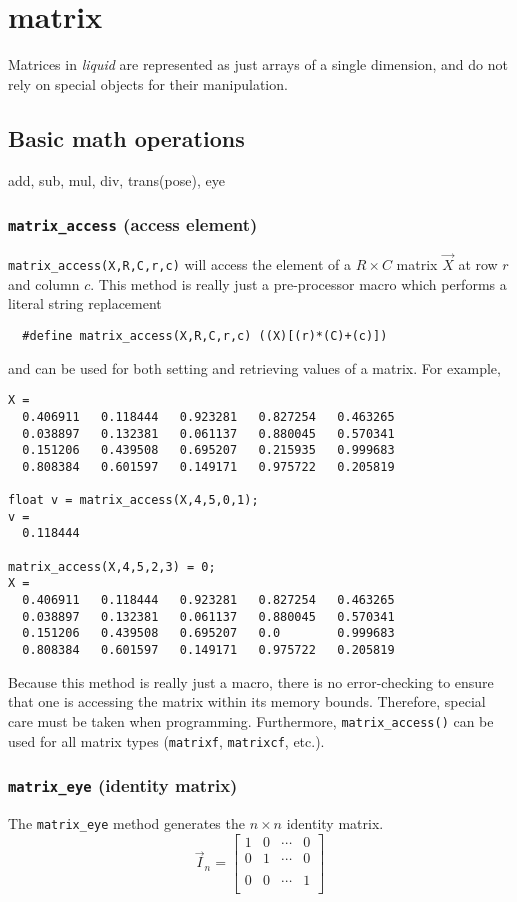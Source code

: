 % 
%
\section{matrix}
\label{module:matrix}
Matrices in {\it liquid} are represented as just arrays of a single dimension,
and do not rely on special objects for their manipulation.


\subsection{Basic math operations}
\label{module:matrix:math}
add, sub, mul, div, trans(pose), eye

\subsubsection{{\tt matrix\_access} (access element)}
{\tt matrix\_access(X,R,C,r,c)} will access the element of a $R \times C$
matrix $\vec{X}$ at row $r$ and column $c$.
This method is really just a pre-processor macro which performs a literal
string replacement
\begin{verbatim}
  #define matrix_access(X,R,C,r,c) ((X)[(r)*(C)+(c)])
\end{verbatim}
and can be used for both setting and retrieving values of a matrix.
For example,
\begin{verbatim}
X = 
  0.406911   0.118444   0.923281   0.827254   0.463265
  0.038897   0.132381   0.061137   0.880045   0.570341
  0.151206   0.439508   0.695207   0.215935   0.999683
  0.808384   0.601597   0.149171   0.975722   0.205819

float v = matrix_access(X,4,5,0,1);
v =
  0.118444

matrix_access(X,4,5,2,3) = 0;
X =
  0.406911   0.118444   0.923281   0.827254   0.463265
  0.038897   0.132381   0.061137   0.880045   0.570341
  0.151206   0.439508   0.695207   0.0        0.999683
  0.808384   0.601597   0.149171   0.975722   0.205819
\end{verbatim}
Because this method is really just a macro, there is no error-checking to
ensure that one is accessing the matrix within its memory bounds.
Therefore, special care must be taken when programming.
Furthermore, {\tt matrix\_access()} can be used for all matrix types
({\tt matrixf}, {\tt matrixcf}, etc.).

\subsubsection{{\tt matrix\_eye} (identity matrix)}
The {\tt matrix\_eye} method generates the $n \times n$ identity matrix.
\[
    \vec{I}_n = 
    \begin{bmatrix}
        1 & 0 & \cdots & 0 \\
        0 & 1 & \cdots & 0 \\
        \\
        0 & 0 & \cdots & 1 \\
    \end{bmatrix}
\]

